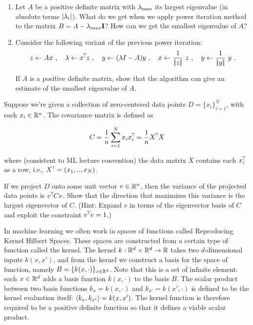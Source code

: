\begin{enumerate}
\item Let $A$ be a positive definite matrix with $\lambda_\text{max}$ its largest
  eigenvalue (in absolute terms $|\lambda_i|$). What do we get when we apply
  power iteration method to the matrix $B = A - \lambda_{max}{\rm\bf I}$? How can we
  get the smallest eigenvalue of $A$?


\item Consider the following variant of the previous power iteration:
  $$z \gets A x~,\quad
  \lambda \gets x^{\!\top\!} z~,\quad
  y \gets (\lambda I - A) y~,\quad
  x \gets \frac{1}{|\!|z|\!|}~ z~,\quad
  y \gets \frac{1}{|\!|y|\!|}~ y~. $$

If $A$ is a positive definite matrix, show that the algorithm can give an
estimate of the smallest eigenvalue of $A$.  %

\end{enumerate}



Suppose we're given a collection of zero-centered data points $D=\{ x_i \}_{i=1}^N$, with each $x_i \in {\mathbb{R}}^n$. The covariance matrix is defined as

$$C = \frac{1}{n} \sum_{i=1}^N x_i x_i^{\!\top\!} = \frac{1}{n} X^{\!\top\!} X $$

where (consistent to ML lecture convention) the data matrix $X$
contains each $x_i^{\!\top\!}$ as a row, i.e., $X^{\!\top\!}=(x_1,..,x_N)$.

If we project $D$ onto some unit vector $v\in{\mathbb{R}}^n$,  then  the  variance  of  the  projected  data  points  is $v^{\!\top\!} C v$. Show
that the direction that maximizes this variance is the largest eigenvector of
$C$.  (Hint: Expand $v$ in terms of the eigenvector basis of
$C$ and exploit the constraint $v^{\!\top\!} v = 1$.)




In machine learning we often work in spaces of functions called
Reproducing Kernel Hilbert Spaces. These spaces are constructed from a
certain type of function called the kernel. The kernel
$k:{\mathbb{R}}^d\times{\mathbb{R}}^d\rightarrow{\mathbb{R}}$ takes two $d$-dimensional inputs
$k(x,x')$, and from the kernel we construct a basis for the space of
function, namely $B = \{ k(x, \cdot) \}_{x\in{\mathbb{R}}^d}$. Note that this is
a set of infinite element: each $x\in{\mathbb{R}}^d$ adds a basis function
$k(x,\cdot)$ to the basis $B$. The scalar product between two basis
functions $k_x = k(x, \cdot)$ and $k_{x'} = k(x',\cdot)$ is defined 
to be the kernel evaluation itself: $\left\langle k_x,k_{x'}\right\rangle = k(x, x')$. The
kernel function is therefore required to be a positive definite
function so that it defines a viable scalar product.

